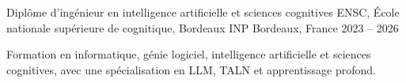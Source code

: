 
\begin{cventries}
  \cventry
    {Diplôme d’ingénieur en intelligence artificielle et sciences cognitives}
    {ENSC, École nationale supérieure de cognitique, Bordeaux INP}
    {Bordeaux, France}
    {2023 -- 2026}
    {
      \begin{cvitems}
        \item {Formation en informatique, génie logiciel, intelligence artificielle et sciences cognitives, avec une spécialisation en LLM, TALN et apprentissage profond.}
      \end{cvitems}
    }
\end{cventries}
